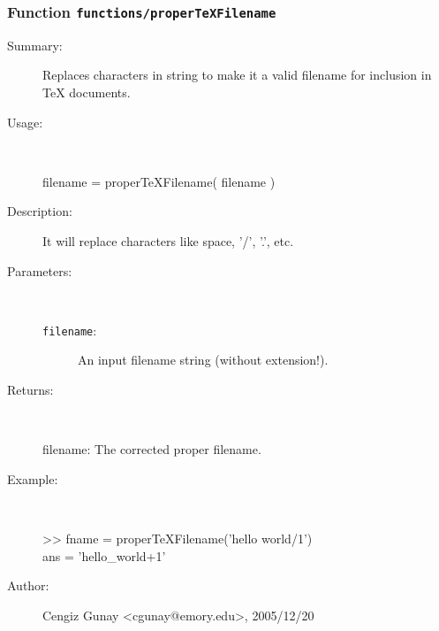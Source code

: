 \subsubsection[Function \texttt{properTeXFilename}]{Function \texttt{functions/properTeXFilename}}%
%
\label{ref_functions__properTeXFilename}%
\hypertarget{ref_functions__properTeXFilename}{}%
\begin{description}
\item[Summary:]Replaces characters in string to make it a valid filename for inclusion in TeX documents.
%
\item[Usage:]~%
\begin{lyxcode}%
filename = properTeXFilename( filename )
%
\end{lyxcode}%
%
\item[Description:]%
It will replace characters like space, '/', '.', etc.
\item[Parameters:]~
\begin{description}%
\item[\texttt{filename}:]
 An input filename string (without extension!).
\end{description}%
%
\item[Returns:
]~

 	filename: The corrected proper filename.
%
\item[Example:]~
\begin{lyxcode} >> fname = properTeXFilename('hello world/1')
\\%
 ans = 'hello\_world+1' 
\\%
\end{lyxcode}
%
%
\item[Author:]%
Cengiz Gunay <cgunay@emory.edu>, 2005/12/20
%
\end{description}
\methodline%
